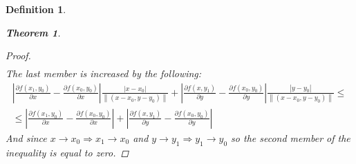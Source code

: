 \documentclass{article}
\newtheorem{theorem}{Theorem}
\newtheorem{definition}{Definition}
\begin{document}
\begin{definition}
\begin{theorem}
\begin{proof}
\begin{gather*}
                    \end{gather*}
                The last member is increased by the following:
                    \begin{gather*}
                        \left\lvert \frac{\partial f(x_1,y_0)}{\partial x} - \frac{\partial f(x_0,y_0)}{\partial x} \right\rvert \frac{\left\lvert x - x_0\right\rvert}{\left\lVert (x-x_0,y-y_0)\right\rVert } + \left\lvert \frac{\partial f(x,y_1)}{\partial y} - \frac{\partial f(x_0,y_0)}{\partial y}\right\rvert \frac{\left\lvert y - y_0\right\rvert}{\left\lVert (x-x_0,y-y_0) \right\rVert } \leq \\ \leq \left\lvert \frac{\partial f(x_1,y_0)}{\partial x} - \frac{\partial f(x_0,y_0)}{\partial x} \right\rvert + \left\lvert \frac{\partial f(x,y_1)}{\partial y} - \frac{\partial f(x_0,y_0)}{\partial y}\right\rvert
                    \end{gather*}
                And since $x \to x_0 \Rightarrow x_1 \to x_0$ and $y \to y_1 \Rightarrow y_1 \to y_0$ so the second member of the inequality is equal to zero.
            \end{proof}
        \end{theorem}
    \end{definition}
\end{document}
